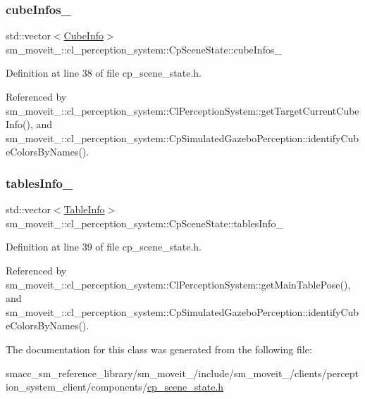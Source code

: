 \subsubsection{\texorpdfstring{cube\+Infos\+\_\+}{cubeInfos\_}}
{\footnotesize\ttfamily std\+::vector$<$\hyperlink{structsm__moveit__4_1_1cl__perception__system_1_1CubeInfo}{Cube\+Info}$>$ sm\+\_\+moveit\+\_\+::cl\+\_\+perception\+\_\+system\+::\+Cp\+Scene\+State\+::cube\+Infos\+\_\+}



Definition at line 38 of file cp\+\_\+scene\+\_\+state.\+h.



Referenced by sm\+\_\+moveit\+\_\+::cl\+\_\+perception\+\_\+system\+::\+Cl\+Perception\+System\+::get\+Target\+Current\+Cube\+Info(), and sm\+\_\+moveit\+\_\+::cl\+\_\+perception\+\_\+system\+::\+Cp\+Simulated\+Gazebo\+Perception\+::identify\+Cube\+Colors\+By\+Names().

\mbox{\label{classsm__moveit__4_1_1cl__perception__system_1_1CpSceneState_a95f74dd16566d97e017650ccdf4b8a46}} 
\subsubsection{\texorpdfstring{tables\+Info\+\_\+}{tablesInfo\_}}
{\footnotesize\ttfamily std\+::vector$<$\hyperlink{structsm__moveit__4_1_1cl__perception__system_1_1TableInfo}{Table\+Info}$>$ sm\+\_\+moveit\+\_\+::cl\+\_\+perception\+\_\+system\+::\+Cp\+Scene\+State\+::tables\+Info\+\_\+}



Definition at line 39 of file cp\+\_\+scene\+\_\+state.\+h.



Referenced by sm\+\_\+moveit\+\_\+::cl\+\_\+perception\+\_\+system\+::\+Cl\+Perception\+System\+::get\+Main\+Table\+Pose(), and sm\+\_\+moveit\+\_\+::cl\+\_\+perception\+\_\+system\+::\+Cp\+Simulated\+Gazebo\+Perception\+::identify\+Cube\+Colors\+By\+Names().



The documentation for this class was generated from the following file\+:\begin{DoxyCompactItemize}
\item 
smacc\+\_\+sm\+\_\+reference\+\_\+library/sm\+\_\+moveit\+\_/include/sm\+\_\+moveit\+\_/clients/perception\+\_\+system\+\_\+client/components/\hyperlink{cp__scene__state_8h}{cp\+\_\+scene\+\_\+state.\+h}\end{DoxyCompactItemize}
